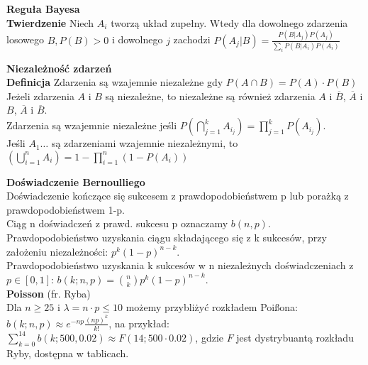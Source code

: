 \documentclass[10pt,landscape,a4paper,notitlepage]{article}
\begin{document}
\begin{multicols*}{4}
        \noindent \textbf{\large Reguła Bayesa}\\
        \textbf{Twierdzenie} Niech $A_i$ tworzą układ zupełny. Wtedy dla dowolnego zdarzenia losowego $B, P(B)>0$ i dowolnego $j$ zachodzi $P(A_j|B)=\frac{P(B|A_j)P(A_j)}{\sum_iP(B|A_i)P(A_i)}$

        \noindent \textbf{\large Niezależność zdarzeń}\\
        \textbf{Definicja} Zdarzenia są wzajemnie niezależne gdy $P(A\cap B)=P(A)\cdot P(B)$\\
        Jeżeli zdarzenia $A$ i $B$ są niezależne, to niezależne są również zdarzenia $A$ i $\overline{B}$, $\overline{A}$ i $B$, $\overline{A}$ i $\overline{B}$.\\
        Zdarzenia są wzajemnie niezależne jeśli $P\left(\bigcap_{j=1}^kA_{i_j}\right) = \prod_{j=1}^kP(A_{i_j})$.\\
        Jeśli $A_1\ldots$ są zdarzeniami wzajemnie niezależnymi, to $\left(\bigcup_{i=1}^nA_i\right)=1-\prod_{i=1}^n(1-P(A_i))$

        \noindent \textbf{\large Doświadczenie Bernoulliego}\\
        Doświadczenie kończące się sukcesem z prawdopodobieństwem p lub porażką z prawdopodobieństwem 1-p.\\
        Ciąg n doświadczeń z prawd. sukcesu p oznaczamy $b(n,p)$.\\
        Prawdopodobieństwo uzyskania ciągu składającego się z k sukcesów, przy założeniu niezależności: $p^k(1-p)^{n-k}$.\\
        Prawdopodobieństwo uzyskania k sukcesów w n niezależnych doświadczeniach z $p\in[0,1]$: $b(k;n,p)=\binom{n}{k}p^k(1-p)^{n-k}$.\\
        \textbf{Poisson} (fr. Ryba)\\
        Dla $n\geq25$ i $\lambda = n\cdot p \leq10$ możemy przybliżyć rozkładem Poi\ss ona: $b(k;n,p)\approx e^{-np}\frac{(np)^k}{k!}$, na przykład:\\
        $\sum_{k=0}^{14}b(k;500,0.02)\approx F(14;500\cdot0.02)$, gdzie $F$ jest dystrybuantą rozkładu Ryby, dostępna w tablicach.
    \end{multicols*}
\end{document}

